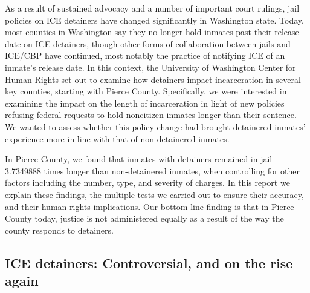 \documentclass[12pt]{report}\usepackage[]{graphicx}\usepackage[]{color}
\begin{document}
As a result of sustained advocacy and a number of important court rulings, jail policies on ICE detainers have changed significantly in Washington state. Today, most counties in Washington say they no longer hold inmates past their release date on ICE detainers, though other forms of collaboration between jails and ICE/CBP have continued, most notably the practice of notifying ICE of an inmate's release date. In this context, the University of Washington Center for Human Rights set out to examine how detainers impact incarceration in several key counties, starting with Pierce County. Specifically, we were interested in examining the impact on the length of incarceration in light of new policies refusing federal requests to hold noncitizen inmates longer than their sentence. We wanted to assess whether this policy change had brought detainered inmates' experience more in line with that of non-detainered inmates.

In Pierce County, we found that inmates with detainers remained in jail \num[round-precision=1]{3.7349888} times longer than non-detainered inmates, when controlling for other factors including the number, type, and severity of charges. In this report we explain these findings, the multiple tests we carried out to ensure their accuracy, and their human rights implications. Our bottom-line finding is that in Pierce County today, justice is not administered equally as a result of the way the county responds to detainers.

\subsection*{ICE detainers: Controversial, and on the rise again}
\end{document}
